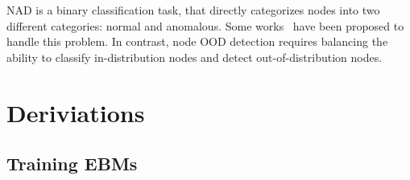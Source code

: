  NAD is a binary classification task, that directly categorizes nodes into two different categories: normal and anomalous. Some works~\citep{dongSpaceGNN,dong2024rayleigh,dong2025smoothgnn,zhao2021usingclassificationdatasetsevaluate,Gong2023BeyondHR} have been proposed to handle this problem. In contrast, node OOD detection requires balancing the ability to classify in-distribution nodes and detect out-of-distribution nodes.


\section{Deriviations}
\label{sec:deriviations}

\subsection{Training EBMs}
\label{sec:grad_ebm_nll}

